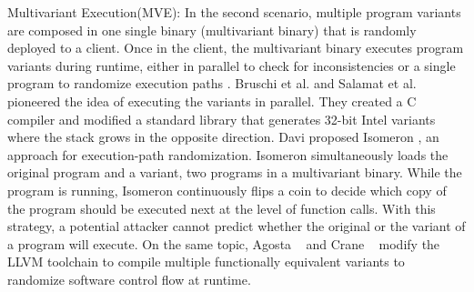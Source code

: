 \begin{usage}{Multivariant Execution(MVE):}
    \label{usage:mve}
    \normalfont
    In the second scenario, multiple program variants are composed in one single binary (multivariant binary) that is randomly deployed to a client. Once in the client, the multivariant binary executes program variants during runtime, either in parallel to check for inconsistencies or a single program to randomize execution paths \cite{bhatkar03}. Bruschi et al. \cite{bruschi2007diversified} and Salamat et al. \cite{salamat2007stopping} pioneered the idea of executing the variants in parallel. They created a C compiler and modified a standard library that generates 32-bit Intel variants where the stack grows in the opposite direction. Davi \etal proposed Isomeron \cite{davi2015isomeron}, an approach  for execution-path randomization. Isomeron simultaneously loads the original program and a variant, \ie two programs in a multivariant binary. While the program is running, Isomeron continuously flips a coin to decide which copy of the program should be executed next at the level of function calls. With this strategy, a potential attacker cannot predict whether the original or the variant of a program will execute. On the same topic,
    Agosta \etal~\cite{agosta2015meet} and Crane \etal~\cite{crane2015thwarting}
    modify the LLVM toolchain to compile multiple functionally equivalent variants to randomize software control flow at runtime.
    

    
\end{usage}


